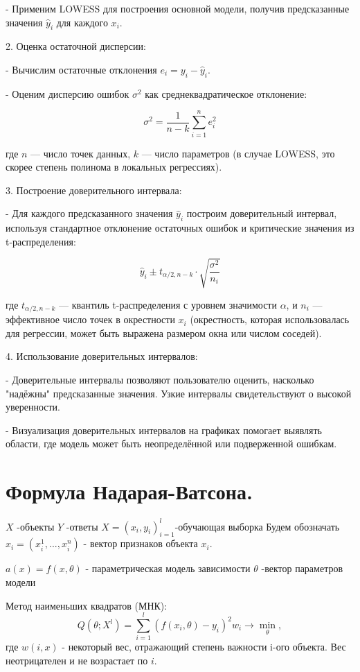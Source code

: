    - Применим LOWESS для построения основной модели, получив предсказанные значения \( \hat{y}_i \) для каждого \(x_i\).

2. Оценка остаточной дисперсии:

   - Вычислим остаточные отклонения \(e_i = y_i - \hat{y}_i\).
   
   - Оценим дисперсию ошибок \(\sigma^2\) как среднеквадратическое отклонение:

     \[
     \sigma^2 = \frac{1}{n-k} \sum_{i=1}^{n} e_i^2
     \]

   где \(n\) — число точек данных, \(k\) — число параметров (в случае LOWESS, это скорее степень полинома в локальных регрессиях).

3. Построение доверительного интервала:

   - Для каждого предсказанного значения \( \hat{y}_i \) построим доверительный интервал, используя стандартное отклонение остаточных ошибок и критические значения из t-распределения:

     \[
     \hat{y}_i \pm t_{\alpha/2, n-k} \cdot \sqrt{\frac{\sigma^2}{n_i}}
     \]

   где \( t_{\alpha/2, n-k} \) — квантиль t-распределения с уровнем значимости \(\alpha\), и \(n_i\) — эффективное число точек в окрестности \(x_i\) (окрестность, которая использовалась для регрессии, может быть выражена размером окна или числом соседей).

4. Использование доверительных интервалов:

   - Доверительные интервалы позволяют пользователю оценить, насколько "надёжны" предсказанные значения. Узкие интервалы свидетельствуют о высокой уверенности.
   
   - Визуализация доверительных интервалов на графиках помогает выявлять области, где модель может быть неопределённой или подверженной ошибкам.

\section{Формула Надарая-Ватсона.}
 $X$ -объекты
 $Y$ -ответы 
 $X = (x_i, y_i)^l_{i=1}$-обучающая выборка
Будем обозначать $x_i = (x_i^1, ..., x_i^n)$ - вектор признаков объекта $x_i$. 

$a(x)= f(x,\theta)$ - параметрическая модель зависимости
$\theta$ -вектор параметров модели

Метод наименьших квадратов (МНК):
\begin{equation*}
    \displaystyle Q(\theta; X^l) =  \sum\limits_{i=1}^l(f(x_i, \theta)-y_i)^2w_i \longrightarrow \min_\theta, 
\end{equation*}
где $w(i,x)$ - некоторый вес, отражающий степень важности i-ого объекта. Вес неотрицателен и не возрастает по $i$. 


